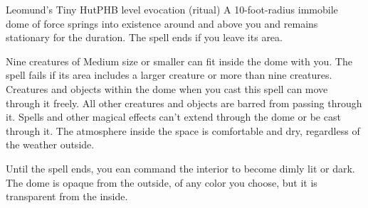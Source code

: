 \begin{spell}{Leomund's Tiny Hut}{PHB}{ level evocation (ritual)}
{
}
A 10-foot-radius immobile dome of force springs into
existence around and above you and remains stationary
for the duration. The spell ends if you leave its area.

Nine creatures of Medium size or smaller can fit inside
the dome with you. The spell fails if its area includes a
larger creature or more than nine creatures. Creatures
and objects within the dome when you cast this spell
can move through it freely. All other creatures and
objects are barred from passing through it. Spells and
other magical effects can't extend through the dome or
be cast through it. The atmosphere inside the space is
comfortable and dry, regardless of the weather outside.

Until the spell ends, you ean command the interior to
become dimly lit or dark. The dome is opaque from the
outside, of any color you choose, but it is transparent
from the inside.
\end{spell}